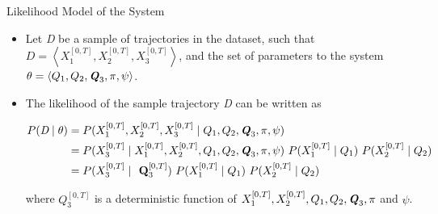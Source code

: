 \documentclass[
	english,%
	aspectratio=169,%
	color={accentcolor=3b},
	logo=true,%
	colorframetitle=false,%
	]{tudabeamer}
\begin{document}
\begin{frame}{Likelihood Model of the System}
\begin{itemize}
	\item Let \textit{D} be a sample of trajectories in the dataset, such that $ \textit{D} = \left\langle X_{1}^{[0, T]}, X_{2}^{[0, T]}, X_{3}^{[0, T]} \right\rangle  $, and the set of parameters to the system $  \theta = \left\langle Q_{1}, Q_{2}, \textbf{\textit{Q}}_{3}, \pi, \psi \right\rangle  $.
	\item The likelihood of the sample trajectory \textit{D} can be written as
	
	\begin{align}
	P(\textit{D} \mid \theta ) & = P(X_{1}^{[0, T]}, X_{2}^{[0, T]}, X_{3}^{[0, T]} \mid Q_{1}, Q_{2}, \textbf{\textit{Q}}_{3}, \pi, \psi) \nonumber\\ & = P(X_{3}^{[0, T]} \mid X_{1}^{[0, T]}, X_{2}^{[0, T]}, Q_{1}, Q_{2}, \textbf{\textit{Q}}_{3}, \pi, \psi) \ P(X_{1}^{[0, T]}\mid Q_{1}) \ P(X_{2}^{[0, T]}\mid Q_{2}) \nonumber\\ & = P(X_{3}^{[0, T]}\mid \textbf{ Q}_{3}^{[0, T]}) \ P(X_{1}^{[0, T]}\mid Q_{1}) \ P(X_{2}^{[0, T]}\mid Q_{2}) 
	\end{align}
	
	where $ Q_{3}^{[0, T]} $ is a deterministic function of $X_{1}^{[0, T]}, X_{2}^{[0, T]}, Q_{1}, Q_{2}, \textbf{\textit{Q}}_{3}, \pi $ and $ \psi $.
\end{itemize}
\end{frame}
\end{document}

